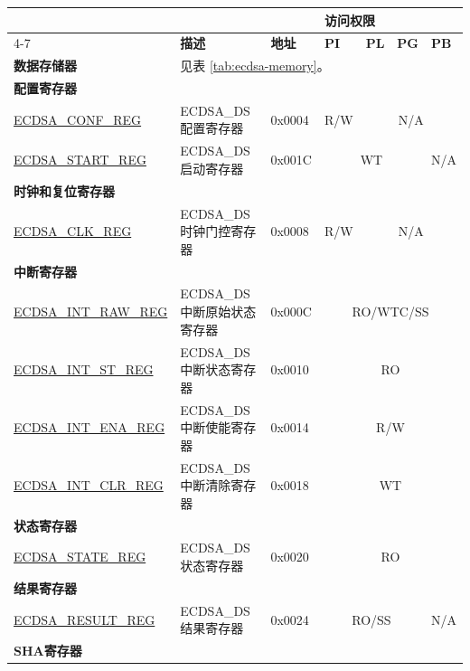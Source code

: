 \begin{longtable}{ | p{4.8cm} | l | p{1.3cm} | l | l | l | l | }
\hline
\rowcolor{lightgray}
 &  &   & \multicolumn{4}{|l|}{\textbf{访问权限}} \\\cline{4-7}
\rowcolor{lightgray}
\multirow{-2}{*}{\textbf{名称}} & \multirow{-2}{*}{\textbf{描述}}  &  \multirow{-2}{*}{\textbf{地址}} & \textbf{PI} & \textbf{PL} & \textbf{PG} & \textbf{PB} \\ \hline
\textbf{数据存储器} & \multicolumn{6}{|l|}{见表 \ref{tab:ecdsa-memory}。} \\ \hline
\multicolumn{7}{|l|}{\textbf{配置寄存器}} \\ \hline
\hyperref[regdesc:ECDSACONFREG]{ECDSA\_CONF\_REG} & ECDSA\_DS 配置寄存器 & 0x0004 & R/W & \multicolumn{3}{|c|}{N/A} \\ \hline
\hyperref[regdesc:ECDSASTARTREG]{ECDSA\_START\_REG} & ECDSA\_DS 启动寄存器 & 0x001C & \multicolumn{3}{|c|}{WT} & N/A \\ \hline
\multicolumn{7}{|l|}{\textbf{时钟和复位寄存器}} \\ \hline
\hyperref[regdesc:ECDSACLKREG]{ECDSA\_CLK\_REG} & ECDSA\_DS 时钟门控寄存器 & 0x0008 & R/W & \multicolumn{3}{|c|}{N/A} \\ \hline
\multicolumn{7}{|l|}{\textbf{中断寄存器}} \\ \hline
\hyperref[regdesc:ECDSAINTRAWREG]{ECDSA\_INT\_RAW\_REG} & ECDSA\_DS 中断原始状态寄存器 & 0x000C & \multicolumn{4}{|c|}{RO/WTC/SS} \\ \hline
\hyperref[regdesc:ECDSAINTSTREG]{ECDSA\_INT\_ST\_REG} & ECDSA\_DS 中断状态寄存器 & 0x0010 & \multicolumn{4}{|c|}{RO} \\ \hline
\hyperref[regdesc:ECDSAINTENAREG]{ECDSA\_INT\_ENA\_REG} & ECDSA\_DS 中断使能寄存器 & 0x0014 & \multicolumn{4}{|c|}{R/W} \\ \hline
\hyperref[regdesc:ECDSAINTCLRREG]{ECDSA\_INT\_CLR\_REG} & ECDSA\_DS 中断清除寄存器 & 0x0018 & \multicolumn{4}{|c|}{WT} \\ \hline
\multicolumn{7}{|l|}{\textbf{状态寄存器}} \\ \hline
\hyperref[regdesc:ECDSASTATEREG]{ECDSA\_STATE\_REG} & ECDSA\_DS 状态寄存器 & 0x0020 & \multicolumn{4}{|c|}{RO} \\ \hline
\multicolumn{7}{|l|}{\textbf{结果寄存器}} \\ \hline
\hyperref[regdesc:ECDSARESULTREG]{ECDSA\_RESULT\_REG} & ECDSA\_DS 结果寄存器 & 0x0024 & \multicolumn{3}{|c|}{RO/SS} & N/A \\ \hline
\multicolumn{7}{|l|}{\textbf{SHA寄存器}} \\ \hline

\end{longtable}
